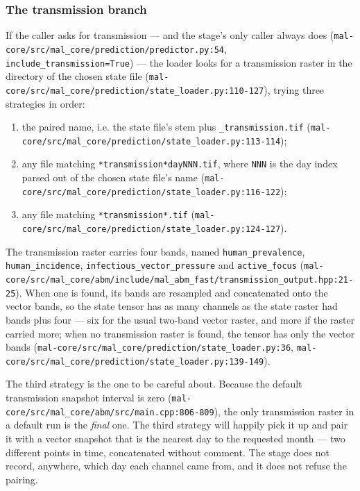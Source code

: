 \documentclass[11pt,a4paper]{article}
\newcommand{\code}[1]{\texttt{#1}}
\begin{document}
\subsubsection{The transmission branch}

If the caller asks for transmission --- and the stage's only caller always
does (\code{mal-core/src/mal\_core/prediction/predictor.py:54},
\code{include\_transmission=True}) --- the loader looks for a transmission
raster in the directory of the chosen state file
(\code{mal-core/src/mal\_core/prediction/state\_loader.py:110-127}), trying
three strategies in order:

\begin{enumerate}
\item the paired name, i.e. the state file's stem plus \code{\_transmission.tif}
  (\code{mal-core/src/mal\_core/prediction/state\_loader.py:113-114});
\item any file matching \code{*transmission*dayNNN.tif}, where \code{NNN} is
  the day index parsed out of the chosen state file's name
  (\code{mal-core/src/mal\_core/prediction/state\_loader.py:116-122});
\item any file matching \code{*transmission*.tif}
  (\code{mal-core/src/mal\_core/prediction/state\_loader.py:124-127}).
\end{enumerate}

The transmission raster carries four bands, named
\code{human\_prevalence}, \code{human\_incidence},
\code{infectious\_vector\_pressure} and \code{active\_focus}
(\code{mal-core/src/mal\_core/abm/include/mal\_abm\_fast/transmission\_output.hpp:21-25}).
When one is found, its bands are resampled and concatenated onto the vector
bands, so the state tensor has as many channels as the state raster had bands
plus four --- six for the usual two-band vector raster, and more if the raster
carried more; when no transmission raster is found, the tensor has only the
vector bands
(\code{mal-core/src/mal\_core/prediction/state\_loader.py:36},
\code{mal-core/src/mal\_core/prediction/state\_loader.py:139-149}).

The third strategy is the one to be careful about. Because the default
transmission snapshot interval is zero
(\code{mal-core/src/mal\_core/abm/src/main.cpp:806-809}), the only transmission
raster in a default run is the \emph{final} one. The third strategy will
happily pick it up and pair it with a vector snapshot that is the nearest day
to the requested month --- two different points in time, concatenated without
comment. The stage does not record, anywhere, which day each channel came
from, and it does not refuse the pairing.
\end{document}
